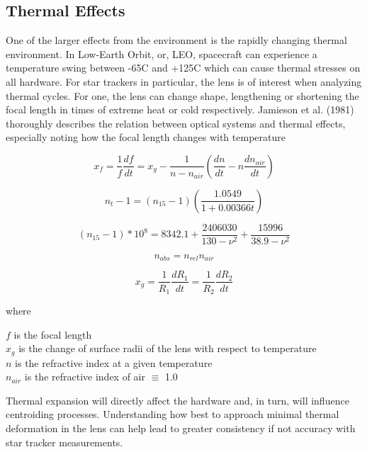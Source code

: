 \subsection*{Thermal Effects}
\par \qquad One of the larger effects from the environment is the rapidly changing thermal environment.
In Low-Earth Orbit, or, LEO, spacecraft can experience a temperature swing between -65C and +125C\cite{NASA_LEO_Env} which can cause thermal stresses on all hardware.
For star trackers in particular, the lens is of interest when analyzing thermal cycles.
For one, the lens can change shape, lengthening or shortening the focal length in times of extreme heat or cold respectively. 
Jamieson et al. (1981) thoroughly describes the relation between optical systems and thermal effects, especially noting how the focal length changes with temperature \cite{thermal_effects_in_optical_systems}

\begin{equation} \label{temp_and_focal_length_eq}
    x_f = \frac{1}{f} \frac{df}{dt} = x_g - \frac{1}{n - n_{air}} \left( \frac{dn}{dt} - n \frac{dn_{air}}{dt} \right)
\end{equation}

\begin{equation} \label{n_at_temp}
    n_t - 1 = (n_{15} - 1)\left(\frac{1.0549}{1 + 0.00366t}\right)
\end{equation}

\begin{equation} \label{n_at_15}
    (n_{15} - 1) * 10^8 = 8342.1 + \frac{2406030}{130 - \nu^2} + \frac{15996}{38.9-\nu^2}
\end{equation}

\begin{equation}
    n_{abs} = n_{rel}n_{air}
\end{equation}

\begin{equation}
    x_g = \frac{1}{R_1} \frac{dR_1}{dt} = \frac{1}{R_2} \frac{dR_2}{dt}
\end{equation}

where 
\begin{center}
    $f$ is the focal length \\
    $x_g$ is the change of surface radii of the lens with respect to temperature \\
    $n$ is the refractive index at a given temperature \\
    $n_{air}$ is the refractive index of air $\equiv$ 1.0
\end{center}

\par \qquad Thermal expansion will directly affect the hardware and, in turn, will influence centroiding processes.
Understanding how best to approach minimal thermal deformation in the lens can help lead to greater consistency if not accuracy with star tracker measurements.